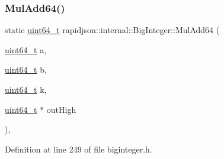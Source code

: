 \subsubsection{\texorpdfstring{MulAdd64()}{MulAdd64()}}
{\footnotesize\ttfamily static \mbox{\hyperlink{stdint_8h_aec6fcb673ff035718c238c8c9d544c47}{uint64\+\_\+t}} rapidjson\+::internal\+::\+Big\+Integer\+::\+Mul\+Add64 (\begin{DoxyParamCaption}\item[{\mbox{\hyperlink{stdint_8h_aec6fcb673ff035718c238c8c9d544c47}{uint64\+\_\+t}}}]{a,  }\item[{\mbox{\hyperlink{stdint_8h_aec6fcb673ff035718c238c8c9d544c47}{uint64\+\_\+t}}}]{b,  }\item[{\mbox{\hyperlink{stdint_8h_aec6fcb673ff035718c238c8c9d544c47}{uint64\+\_\+t}}}]{k,  }\item[{\mbox{\hyperlink{stdint_8h_aec6fcb673ff035718c238c8c9d544c47}{uint64\+\_\+t}} $\ast$}]{out\+High }\end{DoxyParamCaption})\hspace{0.3cm}{\ttfamily [static]}, {\ttfamily [private]}}



Definition at line 249 of file biginteger.\+h.


